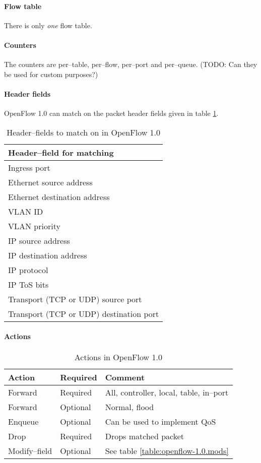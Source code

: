 \paragraph{Flow table}
There is only {\em one} flow table.

\paragraph{Counters}
The counters are per--table, per--flow, per--port and per--queue. (TODO: Can
they be used for custom purposes?)

\paragraph{Header fields} 
OpenFlow 1.0 can match on the packet header fields given in table
\ref{table:openflow-1.0.headers}.

\begin{table}
\begin{tabular}{|l|}
\hline \textbf{Header--field for matching} \\
\hline Ingress port \\
\hline Ethernet source address \\
\hline Ethernet destination address \\
\hline VLAN ID \\
\hline VLAN priority \\
\hline IP source address \\
\hline IP destination address \\
\hline IP protocol \\
\hline IP \ac{ToS} bits \\
\hline Transport (TCP or UDP) source port \\
\hline Transport (TCP or UDP) destination port \\
\hline
\end{tabular}
\caption{Header--fields to match on in OpenFlow 1.0}
\label{table:openflow-1.0.headers}
\end{table}

\paragraph{Actions}

\begin{table}
\begin{tabular}{|l|l|l|}
\hline \textbf{Action} &
       \textbf{Required} &
       \textbf{Comment} \\
\hline Forward & Required & All, controller, local, table, in--port \\
\hline Forward & Optional & Normal, flood \\
\hline Enqueue & Optional &  Can be used to implement \ac{QoS} \\
\hline Drop    & Required &  Drops matched packet \\
\hline Modify--field & Optional &  See table \ref{table:openflow-1.0.mods} \\
\hline
\end{tabular}
\caption{Actions in OpenFlow 1.0}
\label{table:openflow-1.0.actions}
\end{table}


